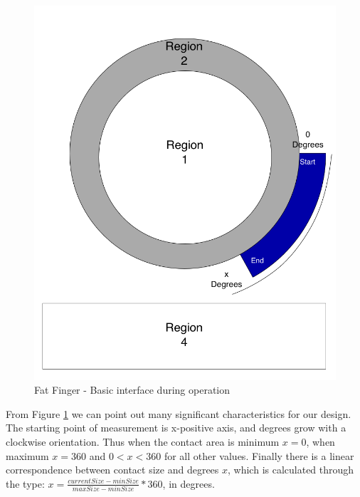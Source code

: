  \begin{figure}[h]
\centering
\includegraphics[scale=0.3]{figures/FFPartlyFilled.png}
\caption{Fat Finger - Basic interface during operation}
\label{fig:FFPartlyFilled}
\end{figure}

From Figure \ref{fig:FFPartlyFilled} we can point out many significant characteristics for our design. The starting point of measurement is x-positive axis, and degrees grow with a clockwise orientation. Thus when the contact area is minimum $x=0$, when maximum $x=360$ and $0<x<360$ for all other values. Finally there is a linear correspondence between contact size and degrees $x$, which is calculated through the type: $x = \frac{currentSize - minSize}{maxSize - minSize} * 360$, in degrees.













